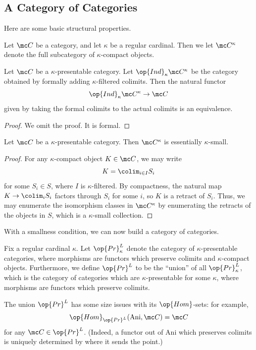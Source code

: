 \documentclass[../notes.tex]{subfiles}
\begin{document}
\subsection{A Category of Categories}
Here are some basic structural properties.
\begin{notation}
	Let $\mc C$ be a category, and let $\kappa$ be a regular cardinal. Then we let $\mc C^\kappa$ denote the full subcategory of $\kappa$-compact objects.
\end{notation}
\begin{theorem}
	Let $\mc C$ be a $\kappa$-presentable category. Let $\op{Ind}_\kappa\mc C^\kappa$ be the category obtained by formally adding $\kappa$-filtered colimits. Then the natural functor
	\[\op{Ind}_\kappa\mc C^\kappa\to\mc C\]
	given by taking the formal colimits to the actual colimits is an equivalence.
\end{theorem}
\begin{proof}
	We omit the proof. It is formal.	
\end{proof}
\begin{proposition} \label{prop:c-kappa-is-essentially-small}
	Let $\mc C$ be a $\kappa$-presentable category. Then $\mc C^\kappa$ is essentially $\kappa$-small.
\end{proposition}
\begin{proof}
	For any $\kappa$-compact object $K\in\mc C$, we may write
	\[K=\colim_{i\in I}S_i\]
	for some $S_i\in S$, where $I$ is $\kappa$-filtered. By compactness, the natural map $K\to\colim_iS_i$ factors through $S_i$ for some $i$, so $K$ is a retract of $S_i$. Thus, we may enumerate the isomorphism classes in $\mc C^\kappa$ by enumerating the retracts of the objects in $S$, which is a $\kappa$-small collection.
\end{proof}
With a smallness condition, we can now build a category of categories.
\begin{notation}
	Fix a regular cardinal $\kappa$. Let $\op{Pr}^L_\kappa$ denote the category of $\kappa$-presentable categories, where morphisms are functors which preserve colimits and $\kappa$-compact objects. Furthermore, we define $\op{Pr}^L$ to be the ``union'' of all $\op{Pr}^L_\kappa$, which is the category of categories which are $\kappa$-presentable for some $\kappa$, where morphisms are functors which preserve colimits.
\end{notation}
\begin{remark}
	The union $\op{Pr}^L$ has some size issues with its $\op{Hom}$-sets: for example,
	\[\op{Hom}_{\op{Pr}^L}(\mathrm{Ani},\mc C)=\mc C\]
	for any $\mc C\in\op{Pr}^L$. (Indeed, a functor out of $\mathrm{Ani}$ which preserves colimits is uniquely determined by where it sends the point.)
\end{remark}
\end{document}
